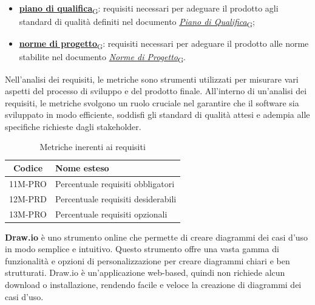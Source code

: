 \begin{enumerate}
\begin{itemize}
		      \item \href{https://7last.github.io/docs/rtb/documentazione-interna/glossario\#piano-di-qualifica}{\textbf{piano di qualifica}\textsubscript{G}}: requisiti necessari per adeguare il prodotto agli standard di qualità definiti nel documento \href{https://7last.github.io/docs/rtb/documentazione-interna/glossario\#piano-di-qualifica}{\textit{Piano di Qualifica}\textsubscript{G}};
		      \item \href{https://7last.github.io/docs/rtb/documentazione-interna/glossario\#norme-di-progetto}{\textbf{norme di progetto}\textsubscript{G}}: requisiti necessari per adeguare il prodotto alle norme stabilite nel documento \href{https://7last.github.io/docs/rtb/documentazione-interna/glossario\#norme-di-progetto}{\textit{Norme di Progetto}\textsubscript{G}}.
	      \end{itemize}
\end{enumerate}


Nell'analisi dei requisiti, le metriche sono strumenti utilizzati per misurare vari aspetti del processo di sviluppo e del prodotto finale. All'interno di un'analisi dei requisiti, le metriche svolgono un ruolo cruciale nel garantire che il software sia sviluppato in modo efficiente, soddisfi gli standard di qualità attesi e adempia alle specifiche richieste dagli stakeholder.
\begin{table}[!h]
	\centering
	\begin{tabular}{|c|l|}
		\hline
		\textbf{Codice} & \textbf{Nome esteso}      \\
		\hline
		11M-PRO 	 & Percentuale requisiti obbligatori            		\\
		12M-PRD 	 & Percentuale requisiti desiderabili            		\\
		13M-PRO 	 & Percentuale requisiti opzionali            			\\
		\hline
	\end{tabular}
	\caption{Metriche inerenti ai requisiti}
\end{table}

\textbf{Draw.io} è uno strumento online che permette di creare diagrammi dei casi d'uso in modo semplice e intuitivo. Questo strumento offre una vasta gamma di funzionalità e opzioni di personalizzazione per creare diagrammi chiari e ben strutturati. Draw.io è un'applicazione web-based, quindi non richiede alcun download o installazione, rendendo facile e veloce la creazione di diagrammi dei casi d'uso.

